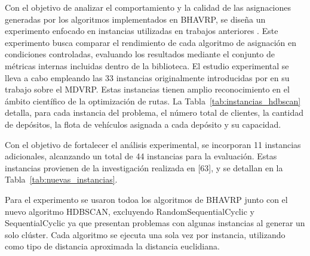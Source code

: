 Con el objetivo de analizar el comportamiento y la calidad de las asignaciones generadas por los algoritmos implementados en BHAVRP, se dise\~na un experimento enfocado en instancias utilizadas en trabajos anteriores \parencite{ericramosaragonIncorporacionModuloMetricas2025, aragonBHAVRPBibliotecaHeuristicas2025}. Este experimento busca comparar el rendimiento de cada algoritmo de asignaci\'on en condiciones controladas, evaluando los resultados mediante el conjunto de m\'etricas internas incluidas dentro de la biblioteca. El estudio experimental se lleva a cabo empleando las 33 instancias originalmente introducidas por \parencite{Cordeau2012} en su trabajo sobre el MDVRP. Estas instancias tienen amplio reconocimiento en el \'ambito cient\'ifico de la optimizaci\'on de rutas. La Tabla~\ref{tab:instancias_hdbscan} detalla, para cada instancia del problema, el n\'umero total de clientes, la cantidad de dep\'ositos, la flota de veh\'iculos asignada a cada dep\'osito y su capacidad.

Con el objetivo de fortalecer el an\'alisis experimental, se incorporan 11 instancias adicionales, alcanzando un total de 44 instancias para la evaluaci\'on. Estas instancias provienen de la investigaci\'on realizada en [63], y se detallan en la Tabla~\ref{tab:nuevas_instancias}.

Para el experimento se usaron todoa los algoritmos de BHAVRP junto con el nuevo algoritmo HDBSCAN, excluyendo RandomSequentialCyclic y SequentialCyclic ya que presentan problemas con algunas instancias al generar un solo clúster. Cada algoritmo se ejecuta una sola vez por instancia, utilizando como tipo de distancia aproximada la distancia euclidiana.

